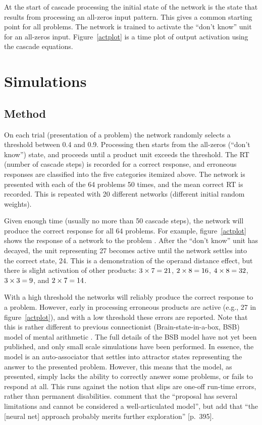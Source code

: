 At the start of cascade processing the initial state of the network is the
state that results from processing an all-zeros input pattern. This gives a
common starting point for all problems.
The network
is trained to activate the ``don't know'' unit  for an all-zeros input.
Figure~\ref{actplot} is a time plot of output activation using
the cascade equations.


\section*{Simulations}

\subsection*{Method}

On each trial (presentation of a problem) the network
randomly selects a threshold between 0.4 and 0.9.  Processing then starts
from the all-zeros (``don't know'') state, and proceeds until a product
unit exceeds the threshold. The RT (number of cascade steps) is recorded
for a correct response, and erroneous responses are classified into the
five categories itemized above. The network is presented with each of the
64 problems 50 times, and the mean correct RT is recorded.  This is
repeated with 20 different networks (different initial random weights).

Given enough time (usually no more than 50 cascade steps), the network
will produce the correct response for all 64 problems. For example,
figure~\ref{actplot} shows the response of a network to the problem .
After the ``don't know'' unit has decayed, the unit representing 27 becomes
active until the network settles into the correct state, 24.  This is a
demonstration of the operand distance effect, but there is slight
activation of other products: $\mbox{$3\times7$}=21$, $\mbox{$2\times8$}=16$, $\mbox{$4\times8$}=32$, $\mbox{$3\times3$}=9$,
and $\mbox{$2\times7$}=14$.

With a high threshold the networks will
reliably produce the correct response to a problem. However, early in
processing erroneous products are active (e.g., 27 in
figure~\ref{actplot}),
and with a low threshold these
errors are reported. Note that this is rather different to previous
connectionist (Brain-state-in-a-box, BSB) model of mental arithmetic
\cite{viscmemo,andestud}.
The full details of the BSB model have not yet been
published, and only small scale simulations have been performed.  In
essence, the model is an auto-associator that settles into attractor states
representing the answer to the presented problem.  However, this means that
the model, as presented, simply lacks the ability to correctly answer some
problems, or fails to respond at all.  This runs against the notion that
slips are one-off run-time errors, rather than permanent disabilities.
 comment that the  ``proposal has several
limitations and cannot be considered a well-articulated model'', but add
that ``the [neural net] approach probably merits further exploration''
[p.~395].

